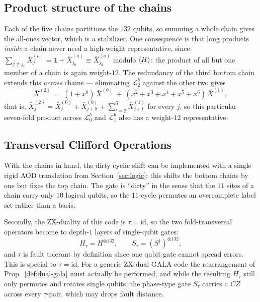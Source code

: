 \subsection{Product structure of the chains}\label{ssec:case-products}

Each of the five chains partitions the $132$ qubits, so summing a whole chain gives the
all-ones vector, which is a stabilizer. One consequence is that long products \emph{inside} a chain never need a high-weight representative, since
$\sum_{j\neq j_0}\bar X^{(a)}_j=\mathbf 1+\bar X^{(a)}_{j_0}\equiv\bar X^{(a)}_{j_0}$ modulo
$\langle H \rangle$: the product of all but one member of a chain is again weight-$12$.  The redundancy of the third bottom chain extends this \emph{across} chains --- eliminating $\mathcal{L}^{b}_{2}$ against the other two gives
\begin{equation}\label{eq:case-cross}
    \bar X^{(2)}\ =\ (1+x^{8})\,\bar X^{(0)}
    \ +\ (x^{2}+x^{3}+x^{4}+x^{5}+x^{6})\,\bar X^{(1)} ,
\end{equation}
that is, $\bar X^{(2)}_j=\bar X^{(0)}_j+\bar X^{(0)}_{j+8}+\sum_{t=2}^{6}\bar X^{(1)}_{j+t}$ for every $j$, so this particular seven-fold product across $\mathcal{L}^{b}_{0}$ and $\mathcal{L}^{b}_{1}$ also has a weight-$12$ representative.  

\subsection{Transversal Clifford Operations}\label{ssec:case-fold}

With the chains in hand, the dirty cyclic shift can be implemented with a single rigid AOD translation from Section~\ref{sec:logic}; this shifts the bottom chains by one but  fixes the top chain.  The gate is ``dirty'' in the sense that the $11$ sites of a chain carry only $10$
logical qubits, so the $11$-cycle permutes an overcomplete label set rather than a basis.

Secondly, the ZX-duality of this code is $\tau=\mathrm{id}$, so the two fold-transversal operators become to depth-$1$ layers of single-qubit gates:
\begin{equation}\label{eq:case-fold}
    H_\tau=H^{\otimes 132},\qquad S_\tau=(S^{\dagger})^{\otimes 132},
\end{equation}
and $\tau$ is fault tolerant by definition since one qubit gate cannot spread errors. This is special to $\tau=\mathrm{id}$.  For a generic ZX-dual GALA code the rearrangement of Prop.~\ref{def:dual-gala} must actually be performed, and while the resulting $H_\tau$ still only permutes and rotates single qubits, the phase-type gate $S_\tau$ carries a
$CZ$ across every $\tau$-pair, which may drops
fault distance. 


